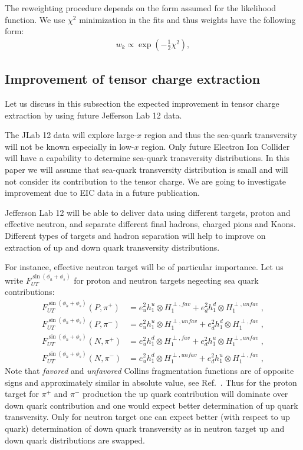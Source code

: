 \documentclass[twocolumn,showpacs,preprintnumbers,amsmath,amssymb,floatfix,prd]{revtex4}
\begin{document}
The reweighting procedure depends on the form assumed for the likelihood 
function. We use $\chi^2$ minimization in the fits and thus weights have the following form:
\begin{align}
	w_k \propto \exp\left(-\frac{1}{2}\chi^2\right),
\label{eq:bayes1}
\end{align}

\subsection{Improvement of tensor charge extraction}
%
Let us discuss in this subsection the expected improvement in tensor charge extraction by using future Jefferson Lab 12 data.

The JLab 12 data will explore large-$x$ region and thus the sea-quark transversity will not be
known especially in low-$x$ region. Only future Electron Ion Collider will have a capability to determine sea-quark transversity distributions.  In this paper we will assume that sea-quark transversity distribution is small and will not consider its contribution to the tensor charge. We are going to investigate improvement due to EIC data in a future publication.

Jefferson Lab 12 will be able to deliver data using different targets, proton and effective neutron, and separate different final hadrons, charged pions and Kaons. Different types of targets and hadron separation will help to improve on extraction of up and down quark transversity distributions.

For instance, effective neutron target will be of particular importance. Let us write
$F_{UT}^{\sin\left(\phi_h +\phi_s\right)}$ for proton and neutron targets negecting sea quark contributions:
\begin{align}
F_{UT}^{\sin\left(\phi_h +\phi_s\right)}(P,\pi^+) &= e_u^2 h_1^{u} \otimes H_1^{\perp, fav} +
e_d^2 h_1^{d} \otimes H_1^{\perp, unfav}\; , \\
F_{UT}^{\sin\left(\phi_h +\phi_s\right)}(P,\pi^-) &= e_u^2 h_1^{u} \otimes H_1^{\perp, unfav} +
e_d^2 h_1^{d} \otimes H_1^{\perp, fav}\; ,\\
F_{UT}^{\sin\left(\phi_h +\phi_s\right)}(N,\pi^+) &= e_u^2 h_1^{d} \otimes H_1^{\perp, fav} +
e_d^2 h_1^{u} \otimes H_1^{\perp, unfav}\; ,\\
F_{UT}^{\sin\left(\phi_h +\phi_s\right)}(N,\pi^-) &= e_u^2 h_1^{d} \otimes H_1^{\perp, unfav} +
e_d^2 h_1^{u} \otimes H_1^{\perp, fav}\; ,
\end{align}
Note that {\em favored} and  {\em unfavored} Collins fragmentation functions are of opposite signs and approximately similar in absolute value, see Ref.~\cite{Kang:2015msa,Anselmino:2013vqa}. Thus for the proton target for $\pi^+$ and $\pi^-$ production the up quark contribution will dominate over down quark contribution and one would expect better determination of up quark transversity.
Only for neutron target one can expect better (with respect to up quark) determination of down quark transversity as in neutron target up and down quark distributions are swapped.
\end{document}
